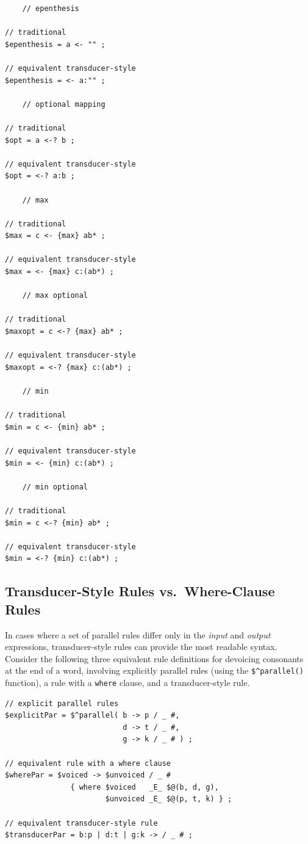 \begin{Verbatim}
	// epenthesis

// traditional
$epenthesis = a <- "" ;

// equivalent transducer-style
$epenthesis = <- a:"" ;

	// optional mapping

// traditional
$opt = a <-? b ;

// equivalent transducer-style
$opt = <-? a:b ;

	// max 

// traditional
$max = c <- {max} ab* ;

// equivalent transducer-style
$max = <- {max} c:(ab*) ;

	// max optional

// traditional
$maxopt = c <-? {max} ab* ;

// equivalent transducer-style
$maxopt = <-? {max} c:(ab*) ;

	// min

// traditional
$min = c <- {min} ab* ;

// equivalent transducer-style
$min = <- {min} c:(ab*) ;

	// min optional

// traditional
$min = c <-? {min} ab* ;

// equivalent transducer-style
$min = <-? {min} c:(ab*) ;
\end{Verbatim}

\subsection{Transducer-Style Rules vs.\ Where-Clause Rules}

In cases where a set of parallel rules differ only in the \emph{input}
and \emph{output} expressions, transducer-style rules can provide the
most readable syntax.  Consider the following three equivalent rule
definitions for devoicing consonants at the end of a word, involving
explicitly parallel rules (using the \verb!$^parallel()! function), a
rule with a \texttt{where} clause, and a transducer-style rule.

\begin{Verbatim}
// explicit parallel rules
$explicitPar = $^parallel( b -> p / _ #,  
                           d -> t / _ #,  
                           g -> k / _ # ) ;

// equivalent rule with a where clause
$wherePar = $voiced -> $unvoiced / _ #  
               { where $voiced   _E_ $@(b, d, g),
                       $unvoiced _E_ $@(p, t, k) } ;

// equivalent transducer-style rule
$transducerPar = b:p | d:t | g:k -> / _ # ;
\end{Verbatim}

